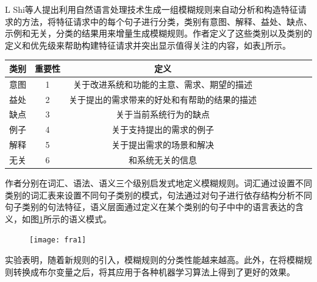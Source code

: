 L Shi等人\cite{shi2017understanding}提出利用自然语言处理技术生成一组模糊规则来自动分析和构造特征请求的方法，将特征请求中的每个句子进行分类，类别有意图、解释、益处、缺点、示例和无关，分类的结果用来增量生成模糊规则。作者定义了这些类别以及类别的定义和优先级来帮助构建特征请求并突出显示值得关注的内容，如表\ref{tab:fra0}所示。
\begin{table}[htb]
    \label{tab:fra0}
    \centering
    \footnotesize%
    \setlength{\tabcolsep}{4pt}%
    \renewcommand{\arraystretch}{1.2}%
\begin{tabular}{lcccccccc}
\hline
类别 & 重要性 & 定义                     \\
\hline
意图 & 1   & 关于改进系统和功能的主意、需求、期望的描述  \\
益处 & 2   & 关于提出的需求带来的好处和有帮助的结果的描述 \\
缺点 & 3   & 关于当前系统行为的缺点            \\
例子 & 4   & 关于支持提出的需求的例子           \\
解释 & 5   & 关于提出需求的场景和解决           \\
无关 & 6   & 和系统无关的信息              \\
\hline
\end{tabular}
\end{table}
作者分别在词汇、语法、语义三个级别启发式地定义模糊规则。词汇通过设置不同类别的词汇表来设置不同句子类别的模式，句法通过对句子进行依存结构分析不同句子类别的句法特征，语义层面通过定义在某个类别的句子中中的语言表达的含义，如图\ref{fig:fra1}所示的语义模式。
\begin{figure}[htb]
    \centering
    \texttt{[image: fra1]}
    \label{fig:fra1}
\end{figure}
实验表明，随着新规则的引入，模糊规则的分类性能越来越高。此外，在将模糊规则转换成布尔变量之后，将其应用于各种机器学习算法上得到了更好的效果。

